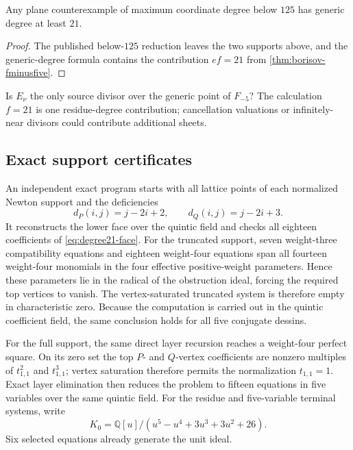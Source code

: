 \begin{corollary}
Any plane counterexample of maximum coordinate degree below \(125\) has
generic degree at least \(21\).
\end{corollary}

\begin{proof}
The published below-\(125\) reduction leaves the two supports above, and the
generic-degree formula contains the contribution \(ef=21\) from
\cref{thm:borisov-fminusfive}.
\end{proof}

\begin{question}
Is \(E_\nu\) the only source divisor over the generic point of \(F_{-5}\)?
The calculation \(f=21\) is one residue-degree contribution; cancellation
valuations or infinitely-near divisors could contribute additional sheets.
\end{question}

\subsection{Exact support certificates}

An independent exact program starts with all lattice points of each
normalized Newton support and the deficiencies
\[
d_P(i,j)=j-2i+2,\qquad d_Q(i,j)=j-2i+3.
\]
It reconstructs the lower face over the quintic field and checks all
eighteen coefficients of \eqref{eq:degree21-face}.  For the truncated
support, seven weight-three compatibility equations and eighteen
weight-four equations span all fourteen weight-four monomials in the four
effective positive-weight parameters.  Hence these parameters lie in the
radical of the obstruction ideal, forcing the required top vertices to
vanish.  The vertex-saturated truncated system is therefore empty in
characteristic zero.  Because the computation is carried out in the
quintic coefficient field, the same conclusion holds for all five
conjugate dessins.

For the full support, the same direct layer recursion reaches a weight-four
perfect square.  On its zero set the top \(P\)- and \(Q\)-vertex
coefficients are nonzero multiples of \(t_{1,1}^2\) and \(t_{1,1}^3\);
vertex saturation therefore permits the normalization \(t_{1,1}=1\).
Exact layer elimination then reduces the problem to fifteen equations in
five variables over the same quintic field.
For the residue and five-variable terminal systems, write
\[
K_0=\mathbb Q[u]/(u^5-u^4+3u^3+3u^2+26).
\]
Six selected equations already generate the unit ideal.

